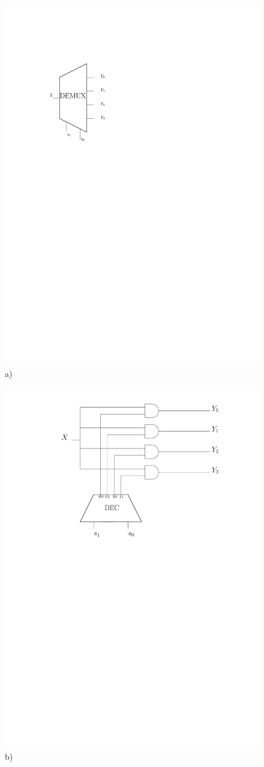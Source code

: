 \begin{figure}[htbp]
   \begin{minipage}[c]{.46\linewidth}
\includegraphics[width=0.5\linewidth]{Figs/demux.pdf} \\\centering a)
   \end{minipage} \hfill
   \begin{minipage}[c]{.46\linewidth}
\includegraphics[width=\linewidth]{Figs/demux_inner.pdf}\\\centering b)

\end{minipage}
\end{figure}
